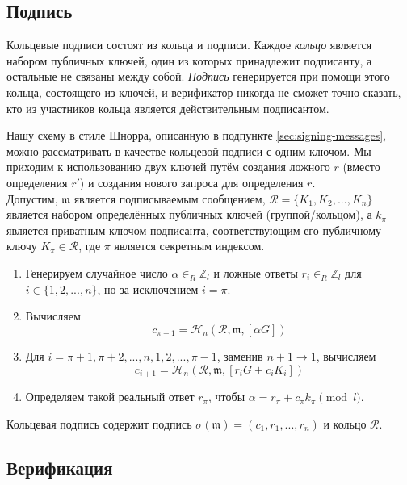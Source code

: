 \subsection*{Подпись}

Кольцевые подписи состоят из кольца и подписи. Каждое {\em кольцо} является набором публич\-ных ключей, один из которых принадлежит подписанту, а остальные не связаны между собой. {\em Подпись} генерируется при помощи этого кольца, состоящего из ключей, и верификатор нико\-гда не сможет точно сказать, кто из участников кольца является действительным подписан\-том.

Нашу схему в стиле Шнорра, описанную в подпункте \ref{sec:signing-messages}, можно рассматривать в качестве кольцевой подписи с одним ключом. Мы приходим к использованию двух ключей путём создания ложного $r$ (вместо определения $r'$) и создания нового запроса для определения $r$.
\\

Допустим, \(\mathfrak{m}\) является подписываемым сообщением, \(\mathcal{R} = \{K_1, K_2, ..., K_n\}\) является набором определённых публичных ключей (группой/кольцом), а \(k_\pi\) является приватным ключом под\-писанта, соответствующим его публичному ключу \(K_\pi \in \mathcal{R}\), где $\pi$ является секретным индек\-сом.

\begin{enumerate}
	\item Генерируем случайное число \(\alpha \in_R \mathbb{Z}_l\) и ложные ответы \(r_i \in_R \mathbb{Z}_l\) для \(i \in \{1, 2, ..., n\}\), но за исключением \(i = \pi\).

	\item Вычисляем
	\[c_{\pi+1} = \mathcal{H}_n(\mathcal{R}, \mathfrak{m}, [\alpha G])\]

	\item Для \(i = \pi+1, \pi+2, ..., n, 1, 2, ..., \pi-1\), заменив \(n + 1 \rightarrow 1\),  вычисляем\vspace{.175cm}
	\[  c_{i+1} = \mathcal{H}_n(\mathcal{R}, \mathfrak{m}, [r_i G + c_i K_i])\] 

	\item Определяем такой реальный ответ $r_\pi$, чтобы \(\alpha = r_\pi + c_\pi k_\pi \pmod l\).
\end{enumerate}

Кольцевая подпись содержит подпись \(\sigma(\mathfrak{m}) = (c_1, r_1, ..., r_n) \) и кольцо $\mathcal{R}$.


\subsection*{Верификация}

